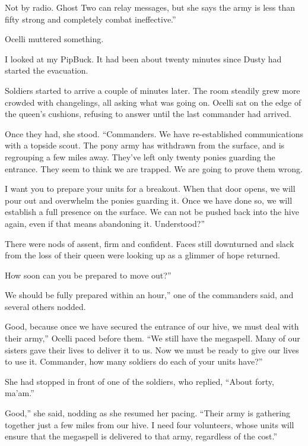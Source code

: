 \leavevmode{}Not by radio. Ghost Two can relay messages, but she says the army is less than fifty strong and completely combat ineffective.”

Ocelli muttered something.

I looked at my PipBuck. It had been about twenty minutes since Dusty had started the evacuation.

Soldiers started to arrive a couple of minutes later. The room steadily grew more crowded with changelings, all asking what was going on. Ocelli sat on the edge of the queen’s cushions, refusing to answer until the last commander had arrived.

Once they had, she stood. “Commanders. We have re-established communications with a topside scout. The pony army has withdrawn from the surface, and is regrouping a few miles away. They’ve left only twenty ponies guarding the entrance. They seem to think we are trapped. We are going to prove them wrong.

\leavevmode{}I want you to prepare your units for a breakout. When that door opens, we will pour out and overwhelm the ponies guarding it. Once we have done so, we will establish a full presence on the surface. We can not be pushed back into the hive again, even if that means abandoning it. Understood?”

There were nods of assent, firm and confident. Faces still downturned and slack from the loss of their queen were looking up as a glimmer of hope returned.

\leavevmode{}How soon can you be prepared to move out?”

\leavevmode{}We should be fully prepared within an hour,” one of the commanders said, and several others nodded.

\leavevmode{}Good, because once we have secured the entrance of our hive, we must deal with their army,” Ocelli paced before them. “We still have the megaspell. Many of our sisters gave their lives to deliver it to us. Now we must be ready to give our lives to use it. Commander, how many soldiers do each of your units have?”

She had stopped in front of one of the soldiers, who replied, “About forty, ma’am.”

\leavevmode{}Good,” she said, nodding as she resumed her pacing. “Their army is gathering together just a few miles from our hive. I need four volunteers, whose units will ensure that the megaspell is delivered to that army, regardless of the cost.”

